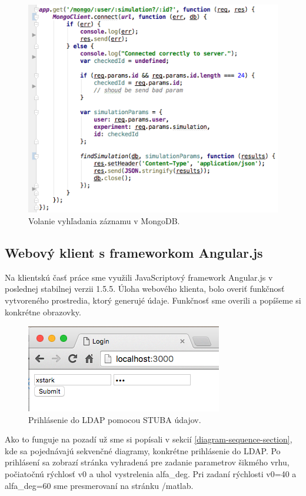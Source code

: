 \begin{figure}[H]
  \centering
  \includegraphics[scale=0.7]{img/code/express-mongodb-find2.png}
  \caption{Volanie vyhľadania záznamu v MongoDB.}
  \label{img-express-mongodb-find}
\end{figure}
 
\subsection{Webový klient s frameworkom Angular.js}
Na klientskú časť práce sme využili JavaScriptový framework Angular.js v poslednej stabilnej verzii 1.5.5. Úloha webového klienta, bolo overiť funkčnosť vytvoreného prostredia, ktorý generujé údaje. Funkčnosť sme overili a popíšeme si konkrétne obrazovky.

\begin{figure}[H]
  \centering
  \includegraphics[scale=0.7]{img/code/angular-login.png}
  \caption{Prihlásenie do LDAP pomocou STUBA údajov.}
  \label{img-angular-login}
\end{figure}

Ako to funguje na pozadí už sme si popísali v sekcií \ref{diagram-sequence-section}, kde sa pojednávajú sekvenčné diagramy, konkrétne prihlásenie do LDAP.
Po prihlásení sa zobrazí stránka vyhradená pre zadanie parametrov šikmého vrhu, počiatočnú rýchlosť v0 a uhol vystrelenia alfa\_deg. Pri zadaní rýchlosti v0=40 a alfa\_deg=60 sme presmerovaní na stránku /matlab.

